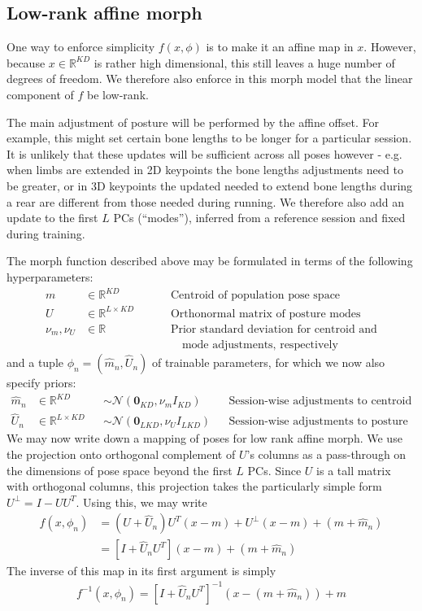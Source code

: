 \documentclass{article}         %
\newcommand{\inv}{^{-1}}
\newcommand{\RR}{\mathbb{R}}
\newcommand{\NN}{\mathcal{N}}
\newcommand{\pn}[1]{\left( #1 \right)}
\newcommand{\bc}[1]{\left[ #1 \right]}
\begin{document}
\subsection{Low-rank affine morph}

One way to enforce simplicity $f(x, \phi)$ is to make it an affine map in $x$. However, because $x\in\RR^{KD}$ is rather high dimensional, this still leaves a huge number of degrees of freedom. We therefore also enforce in this morph model that the linear component of $f$ be low-rank.

The main adjustment of posture will be performed by the affine offset. For example, this might set certain bone lengths to be longer for a particular session. It is unlikely that these updates will be sufficient across all poses however - e.g. when limbs are extended in 2D keypoints the bone lengths adjustments need to be greater, or in 3D keypoints the updated needed to extend bone lengths during a rear are different from those needed during running. We therefore also add an update to the first $L$ PCs (``modes''), inferred from a reference session and fixed during training.

The morph function described above may be formulated in terms of the following hyperparameters:
\begin{align*}
    m&\in \RR^{KD} &&
        && \text{Centroid of population pose space} \\
    U&\in \RR^{L\times KD} &&
        && \text{Orthonormal matrix of posture modes} \\
    \nu_m, \nu_U &\in \RR &&
        && \text{Prior standard deviation for centroid and} \\
    &&& && \quad\text{mode adjustments, respectively}
\end{align*}
and a tuple $\phi_n = (\hat{m}_n, \hat{U}_n)$ of trainable parameters, for which we now also specify priors:
\begin{align*}
    \hat{m}_n &\in \RR^{KD} && \sim \NN(\mathbf{0}_{KD}, \nu_{m} I_{KD})  
        && \text{Session-wise adjustments to centroid pose} \\
    \hat{U}_n&\in \RR^{L\times KD} &&\sim \NN(\mathbf{0}_{LKD}, \nu_{U} I_{LKD})
        && \text{Session-wise adjustments to posture modes}
\end{align*}
We may now write down a mapping of poses for low rank affine morph. We use the projection onto orthogonal complement of $U$'s columns as a pass-through on the dimensions of pose space beyond the first $L$ PCs. Since $U$ is a tall matrix with orthogonal columns, this projection takes the particularly simple form $U^\perp = I - UU^T$. Using this, we may write
\begin{align}
    f(x, \phi_n) &= \pn{U + \hat{U}_n} U^T (x - m) + U^\perp (x - m) + (m + \hat{m}_n) \\
    &= \bc{I + \hat{U}_n U^T} (x - m) + (m + \hat{m}_n) 
\end{align}
The inverse of this map in its first argument is simply
\begin{align}
    f\inv(x, \phi_n) = \bc{ I + \hat{U}_n U^T }\inv (x - (m + \hat{m}_n)) + m
\end{align}
\end{document}
